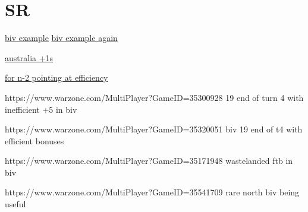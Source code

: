 \section{SR}

\href{https://www.warzone.com/MultiPlayer?GameID=21404136}{biv example}
\href{https://www.warzone.com/MultiPlayer?GameID=38355492}{biv example again}

\href{https://www.warzone.com/MultiPlayer?GameID=37710045}{australia +1s}

\href{https://www.warzone.com/MultiPlayer?GameID=40293357}{for n-2 pointing at efficiency}


https://www.warzone.com/MultiPlayer?GameID=35300928 19 end of turn 4 with inefficient +5 in biv

https://www.warzone.com/MultiPlayer?GameID=35320051 biv 19 end of t4 with efficient bonuses

https://www.warzone.com/MultiPlayer?GameID=35171948 wastelanded ftb in biv

https://www.warzone.com/MultiPlayer?GameID=35541709 rare north biv being useful


\\
\\
